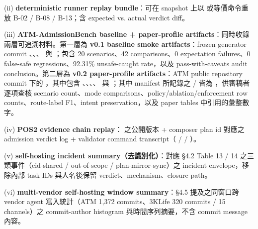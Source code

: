 \documentclass[a4paper,fontset=none]{ctexart}
\begin{document}
(ii) \textbf{deterministic runner replay bundle}：可在 \texttt{} snapshot 上以 \texttt{} 或等價命令重放 B-02 / B-08 / B-13；含 expected vs. actual verdict diff。

(iii) \textbf{ATM-AdmissionBench baseline + paper-profile artifacts}：同時收錄兩層可追溯材料。第一層為 \textbf{v0.1 baseline smoke artifacts}：frozen generator commit \texttt{}、\texttt{}、\texttt{}、\texttt{} 與 \texttt{}；包含 20 scenarios、42 comparisons、0 expectation failures、0 false-safe regressions、92.31\% unsafe-caught rate，以及 pass-with-caveats audit conclusion。第二層為 \textbf{v0.2 paper-profile artifacts}：ATM public repository \texttt{} commit \texttt{} 下的 \texttt{}，其中包含 \texttt{}、\texttt{}、\texttt{}、\texttt{}、\texttt{} 與 \texttt{}；其中 manifest 所記錄之 \texttt{} / \texttt{} 皆為 \texttt{}，供審稿者逐項查核 scenario count、mode comparisons、policy/ablation/enforcement row counts、route-label F1、intent preservation，以及 paper tables 中引用的彙整數字。

(iv) \textbf{POS2 evidence chain replay}：\texttt{} 之公開版本 + composer plan id \texttt{} 對應之 admission verdict log + validator command transcript（\texttt{} / \texttt{} / \texttt{}）。

(v) \textbf{self-hosting incident summary（去識別化）}：對應 §4.2 Table 13 / 14 之三類事件（cid-shared / out-of-scope / plan-mirror-sync）之 incident envelope，移除內部 task IDs 與人名後保留 verdict、mechanism、closure path。

(vi) \textbf{multi-vendor self-hosting window summary}：§4.5 提及之同窗口跨 vendor agent 寫入統計（ATM 1,372 commits、3KLife 320 commits / 15 channels）之 commit-author histogram 與時間序列摘要，不含 commit message 內容。
\end{document}

